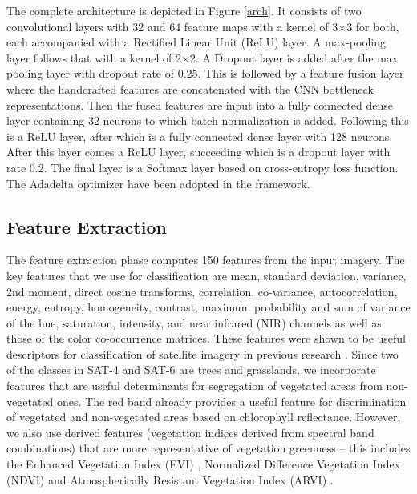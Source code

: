 \documentclass[]{interact}
\theoremstyle{plain}\newtheorem{theorem}{Theorem}[section]
\theoremstyle{definition}
\theoremstyle{remark}
\begin{document}
The complete architecture  is depicted in Figure \ref{arch}. It consists of  two convolutional layers with 32 and 64 feature maps with a kernel of 3$\times$3 for both, each accompanied with a Rectified Linear Unit (ReLU) layer. A max-pooling layer follows that with a kernel of 2$\times$2. A Dropout layer  is  added after the max pooling layer with dropout rate of  0.25. This is followed by a feature fusion layer where  the handcrafted features are concatenated with the  CNN bottleneck representations. Then the fused features are  input into a  fully connected dense  layer  containing 32  neurons to which batch normalization is added. Following this is a ReLU layer, after which is a fully connected dense layer with  128 neurons. After this layer comes a ReLU layer,   succeeding which is a   dropout layer with  rate   0.2.  The final layer is  a Softmax layer based on cross-entropy loss function. The Adadelta optimizer \citep{zeiler2012adadelta} have been adopted in the framework. 

\subsection{Feature Extraction}
The feature extraction phase computes 150 features from the input imagery.  The key features that we use for classification are mean, standard deviation, variance, 2nd moment, direct cosine transforms, correlation, co-variance, autocorrelation, energy, entropy, homogeneity, contrast, maximum probability and sum of variance of the hue, saturation, intensity, and near infrared (NIR) channels as well as those of the color co-occurrence matrices. These features were shown to be useful descriptors for classification of satellite imagery in previous research \citep{haralick1973}. Since two of the classes in SAT-4 and SAT-6 are trees and grasslands, we incorporate features that are useful determinants for segregation of vegetated areas from non-vegetated ones. The red band already provides a useful feature for discrimination of vegetated and non-vegetated areas based on chlorophyll reflectance.  However, we also use derived features (vegetation indices derived from spectral band combinations) that are more representative of vegetation greenness -- this includes the Enhanced Vegetation Index (EVI) \citep{huete2002}, Normalized Difference Vegetation Index (NDVI) \citep{rouse1974} and Atmospherically Resistant Vegetation Index (ARVI) \citep{kaufman1992}. 
\end{document}
